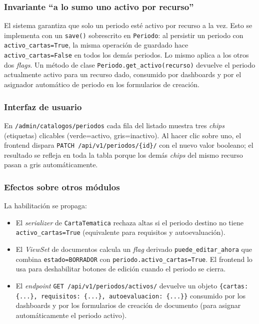\subsubsection{Invariante ``a lo sumo uno activo por recurso''}

El sistema garantiza que solo un periodo esté activo por recurso a la vez. Esto se implementa con un \texttt{save()} sobrescrito en \texttt{Periodo}: al persistir un periodo con \texttt{activo\_cartas=True}, la misma operación de guardado hace \texttt{activo\_cartas=False} en todos los demás periodos. Lo mismo aplica a los otros dos \emph{flags}. Un método de clase \texttt{Periodo.get\_activo(recurso)} devuelve el periodo actualmente activo para un recurso dado, consumido por dashboards y por el asignador automático de periodo en los formularios de creación.

\subsubsection{Interfaz de usuario}

En \texttt{/admin/catalogos/periodos} cada fila del listado muestra tres \emph{chips} (etiquetas) clicables (verde=activo, gris=inactivo). Al hacer clic sobre uno, el frontend dispara \texttt{PATCH /api/v1/periodos/\{id\}/} con el nuevo valor booleano; el resultado se refleja en toda la tabla porque los demás \emph{chips} del mismo recurso pasan a gris automáticamente.

\subsubsection{Efectos sobre otros módulos}

La habilitación se propaga:

\begin{itemize}
    \item El \emph{serializer} de \texttt{CartaTematica} rechaza altas si el periodo destino no tiene \texttt{activo\_cartas=True} (equivalente para requisitos y autoevaluación).
    \item El \emph{ViewSet} de documentos calcula un \emph{flag} derivado \texttt{puede\_editar\_ahora} que combina \texttt{estado=BORRADOR} con \texttt{periodo.activo\_cartas=True}. El frontend lo usa para deshabilitar botones de edición cuando el periodo se cierra.
    \item El \emph{endpoint} \texttt{GET /api/v1/periodos/activos/} devuelve un objeto \texttt{\{cartas: \{...\}, requisitos: \{...\}, autoevaluacion: \{...\}\}} consumido por los dashboards y por los formularios de creación de documento (para asignar automáticamente el periodo activo).
\end{itemize}


